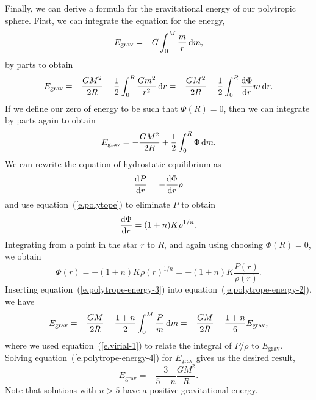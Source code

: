 Finally, we can derive a formula for the gravitational energy of our polytropic sphere.  First, we can integrate the equation for the energy,
\[
E_{\mathrm{grav}} = -G\int_{0}^{M}\frac{m}{r}\,\mathrm{d} m,
\]
by parts to obtain
\begin{equation}\label{e.polytrope-energy-1}
E_{\mathrm{grav}} = -\frac{GM^{2}}{2R} - \frac{1}{2}\int_{0}^{R}\frac{Gm^{2}}{r^{2}}\,\mathrm{d} r = -\frac{GM^{2}}{2R} - \frac{1}{2}\int_{0}^{R} \frac{\mathrm{d}\Phi}{\mathrm{d} r} m\,\mathrm{d} r.
\end{equation}
If we define our zero of energy to be such that $\Phi(R) = 0$, then we can integrate by parts again to obtain
\begin{equation}\label{e.polytrope-energy-2}
E_{\mathrm{grav}} = -\frac{GM^{2}}{2R} + \frac{1}{2}\int_{0}^{R} \Phi\,\mathrm{d} m.
\end{equation}
We can rewrite the equation of hydrostatic equilibrium as
\[ \frac{\mathrm{d} P}{\mathrm{d} r} = -\frac{\mathrm{d}\Phi}{\mathrm{d} r} \rho \]
and use equation~(\ref{e.polytope}) to eliminate $P$ to obtain
\[ \frac{\mathrm{d}\Phi}{\mathrm{d} r} = (1+n) K \rho^{1/n} .\]
Integrating from a point in the star $r$ to $R$, and again using choosing $\Phi(R) = 0$, we obtain
\begin{equation}\label{e.polytrope-energy-3}
\Phi(r) = -(1+n)K\rho(r)^{1/n} = -(1+n)K\frac{P(r)}{\rho(r)}.
\end{equation}
Inserting equation~(\ref{e.polytrope-energy-3}) into equation~(\ref{e.polytrope-energy-2}), we have
\begin{equation}\label{e.polytrope-energy-4}
E_{\mathrm{grav}} = -\frac{GM}{2R} - \frac{1+n}{2}\int_{0}^{M} \frac{P}{m}\,\mathrm{d} m = -\frac{GM}{2R} - \frac{1+n}{6}E_{\mathrm{grav}},
\end{equation}
where we used equation~(\ref{e.virial-1}) to relate the integral of $P/\rho$ to $E_{\mathrm{grav}}$. Solving equation~(\ref{e.polytrope-energy-4}) for $E_{\mathrm{grav}}$ gives us the desired result,
\begin{equation}\label{e.polytrope-energy}
E_{\mathrm{grav}} = -\frac{3}{5-n} \frac{GM^{2}}{R}.
\end{equation}
Note that solutions with $n > 5$ have a positive gravitational energy.

